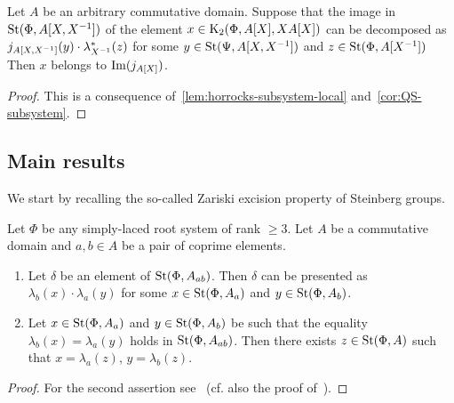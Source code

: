 \begin{cor} \label{cor:horrocks--ingredient}
    Let $A$ be an arbitrary commutative domain.
    Suppose that the image in $\operatorname{St}(\Phi, A[X, X^{-1}])$ of the element $x \in \operatorname{K}_2(\Phi, A[X], XA[X])$
    can be decomposed as $j_{A[X, X^{-1}]}(y) \cdot \lambda_{X^{-1}}^*(z)$ for
    some $y \in \operatorname{St}(\Psi, A[X, X^{-1}])$ and $z \in \operatorname{St}(\Phi, A[X^{-1}])$
    Then $x$ belongs to $\operatorname{Im}(j_{A[X]})$.
\end{cor}
\begin{proof}
    This is a consequence of~\cref{lem:horrocks-subsystem-local} and~\cref{cor:QS-subsystem}.
\end{proof}

\subsection{Main results}

We start by recalling the so-called Zariski excision property of Steinberg groups.
\begin{lemma} \label{lem:zariski-glueing}
Let $\Phi$ be any simply-laced root system of rank $\geq 3$.
Let $A$ be a commutative domain and $a, b \in A$ be a pair of coprime elements.
\begin{enumerate}
    \item Let $\delta$ be an element of $\operatorname{St}(\Phi, A_{ab})$.
    Then $\delta$ can be presented as $\lambda_b(x) \cdot \lambda_a(y)$ for some
    $x  \in \operatorname{St}(\Phi, A_a)$ and $y \in \operatorname{St}(\Phi, A_b)$.
    \item  Let $x \in \operatorname{St}(\Phi, A_a)$ and $y \in \operatorname{St}(\Phi, A_b)$ be such that the equality $\lambda_b(x) = \lambda_a(y)$ holds in $\operatorname{St}(\Phi, A_{ab})$.
    Then there exists $z \in \operatorname{St}(\Phi, A)$ such that $x = \lambda_a(z)$, $y = \lambda_b(z)$.
\end{enumerate}
\end{lemma}
\begin{proof}
    For the second assertion see~\cite[Proposition~4.4]{LSV2}
    (cf. also the proof of~\cite[Lemma~2.6]{LSV2}).
\end{proof}


